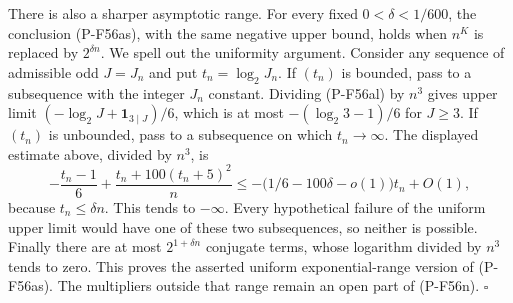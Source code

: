 \documentclass[11pt,a4paper]{article}
\begin{document}
There is also a sharper asymptotic range. For every fixed
$0<\delta<1/600$, the conclusion (P-F56as), with the
same negative upper bound, holds when $n^K$ is replaced
by $2^{\delta n}$. We spell out the uniformity argument.
Consider any sequence of admissible odd $J=J_n$ and put
$t_n=\log_2J_n$. If $(t_n)$ is bounded, pass to a
subsequence with the integer $J_n$ constant. Dividing
(P-F56al) by $n^3$ gives upper limit
$(-\log_2J+\mathbf1_{3\mid J})/6$, which is at most
$-(\log_2 3-1)/6$ for $J\ge3$.
If $(t_n)$ is unbounded, pass to a subsequence on which
$t_n\to\infty$. The displayed estimate above, divided
by $n^3$, is
\[
 -\frac{t_n-1}{6}
        +\frac{t_n+100(t_n+5)^2}{n}
 \le-\bigl(1/6-100\delta-o(1)\bigr)t_n+O(1),
\]
because $t_n\le\delta n$. This tends to $-\infty$.
Every hypothetical failure of the uniform upper limit
would have one of these two subsequences, so neither
is possible. Finally there are at most $2^{1+\delta n}$
conjugate terms, whose logarithm divided by $n^3$ tends
to zero. This proves the asserted uniform exponential-range
version of (P-F56as). The multipliers outside that range
remain an open part of (P-F56n).
\hfill$\square$
\end{document}
